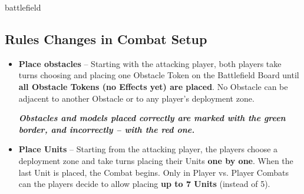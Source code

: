 \begin{expansion}{battlefield}
\begin{multicols*}{2}
  \subsection*{Rules Changes in Combat Setup}
  \begin{itemize}
    \item \textbf{Place obstacles} – Starting with the attacking player, both players take turns choosing and placing one Obstacle Token on the Battlefield Board until \textbf{all Obstacle Tokens (no Effects yet) are placed}.
    No Obstacle can be adjacent to another Obstacle or to any player's deployment zone.

    {\footnotesize\textbf{\textit{\textcolor{darkcandyapplered}{Obstacles and models placed correctly are marked with the green border, and incorrectly -- with the red one.}}}}
    \item \textbf{Place Units} – Starting from the attacking player, the players choose a deployment zone and take turns placing their Units \textbf{one by one}.
    When the last Unit is placed, the Combat begins.
    Only in Player vs. Player Combats can the players decide to allow placing \textbf{up to 7 Units} (instead of 5).
  \end{itemize}
  \end{multicols*}
\end{expansion}

